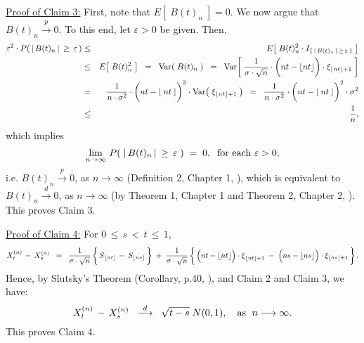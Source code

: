 \begin{enumerate}
		\vskip 0.5cm
		\noindent
		\underline{Proof of Claim 3:}\quad
		First, note that $E\!\left[\;B(t)_{n}\;\right] = 0$.
		We now argue that $B(t)_{n} \overset{p}{\longrightarrow} 0$.
		To this end, let $\varepsilon > 0$ be given.
		Then,
		\begin{eqnarray*}
		\varepsilon^{2} \cdot P\!\left(\,\vert\,B(t)_{n}\,\vert\,\geq\,\varepsilon\,\right)
		&\leq& E\!\left[\;B(t)^{2}_{n} \cdot I_{\{\,\vert\,B(t)_{n}\,\vert\,\geq\,\varepsilon\,\}}\;\right]
		\\
		&\leq& E\!\left[\;B(t)_{n}^{2}\;\right]
		\;\;=\;\; \Var\!\left(\;B(t)_{n}\;\right)
		\;\;=\;\;
			\Var\!\left[\;
				\dfrac{1}{\sigma\cdot\sqrt{n}}
				\cdot
				\left(\overset{{\color{white}1}}{nt} - \lfloor nt \rfloor\right)
				\cdot
				\xi_{\lfloor nt \rfloor + 1}
			\;\right]
		\\
		&=&
			\dfrac{1}{n\cdot\sigma^{2}}
			\cdot
			\left(\overset{{\color{white}1}}{nt} - \lfloor\,nt\,\rfloor\right)^{2}
			\cdot
			\Var\!\left(\;\xi_{\lfloor nt \rfloor + 1}\;\right)
		\;\;=\;\;
			\dfrac{1}{n\cdot\sigma^{2}}
			\cdot
			\left(\overset{{\color{white}1}}{nt} - \lfloor\,nt\,\rfloor\right)^{2}
			\cdot
			\sigma^{2}
		\\
		&\leq& \dfrac{1}{n},
		\end{eqnarray*}
		which implies
		\begin{equation*}
		\lim_{n\rightarrow\infty}\,P\!\left(\;\vert\,B(t)_{n}\,\vert\,\geq\,\varepsilon\;\right) \; = \; 0,
		\;\;
		\textnormal{for each $\varepsilon > 0$},
		\end{equation*}
		i.e. $B(t)_{n}\overset{p}{\longrightarrow}0$, as $n\longrightarrow\infty$
		(Definition 2, Chapter 1, \cite{Ferguson1996}),
		which is equivalent to $B(t)_{n}\overset{d}{\longrightarrow}0$, as $n\longrightarrow\infty$
		(by Theorem 1, Chapter 1 and Theorem 2, Chapter 2, \cite{Ferguson1996}).
		This proves Claim 3.

		\vskip 0.5cm
		\noindent
		\underline{Proof of Claim 4:}\quad
		For $0 \,\leq\, s \,<\, t \,\leq\, 1$,
		\begin{equation*}
		X^{(n)}_{t} \,-\, X^{(n)}_{s}
		\;\; = \;\;
		\dfrac{1}{\sigma\cdot\sqrt{n}}
		\left\{\,
			\overset{{\color{white}1}}{S}_{\lfloor nt \rfloor} \,-\, S_{\lfloor ns \rfloor}
		\,\right\}
		\;+\;
		\dfrac{1}{\sigma\cdot\sqrt{n}}
		\left\{\,
			\left(\overset{{\color{white}1}}{n}t - \lfloor nt \rfloor\right)\cdot\overset{{\color{white}1}}{\xi}_{\lfloor nt \rfloor+1}
			\;-\; \left(\overset{{\color{white}1}}{n}s - \lfloor ns \rfloor\right)\cdot\xi_{\lfloor ns \rfloor+1}
		\,\right\}.
		\end{equation*}
		Hence, by Slutsky's Theorem (Corollary, p.40, \cite{Ferguson1996}), and Claim 2 and Claim 3, we have:
		\begin{equation*}
		X^{(n)}_{t} \,-\, X^{(n)}_{s}
		\;\; \overset{d}{\longrightarrow} \;\;
		\sqrt{t - s}\;N(0,1),
		\quad
		\textnormal{as \;$n \longrightarrow\infty$}.
		\end{equation*}
		This proves Claim 4.


\end{enumerate}
